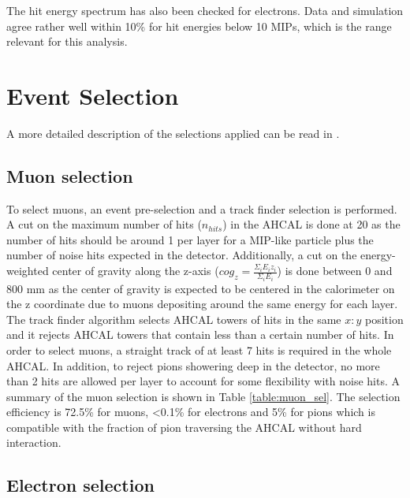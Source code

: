 \documentclass{JINST}
\begin{document}
The hit energy spectrum has also been checked for electrons. Data and simulation agree rather well within 10\% for hit energies below 10 MIPs, which is the range relevant for this analysis.

\section{Event Selection}

A more detailed description of the selections applied can be read in \cite{Brianne:2018rur}.

\subsection{Muon selection}

To select muons, an event pre-selection and a track finder \cite{Hartbrich:2016bbz} selection is performed. A cut on the maximum number of hits ($n_{hits}$) in the AHCAL is done at 20 as the number of hits should be around 1 per layer for a MIP-like particle plus the number of noise hits expected in the detector. Additionally, a cut on the energy-weighted center of gravity along the z-axis ($cog_{z} = \frac{\Sigma_{i} E_{i}z_{i}}{\Sigma_{i} E_{i}}$) is done between 0 and 800 mm as the center of gravity is expected to be centered in the calorimeter on the z coordinate due to muons depositing around the same energy for each layer. The track finder algorithm selects AHCAL towers of hits in the same $x:y$ position and it rejects AHCAL towers that contain less than a certain number of hits. In order to select muons, a straight track of at least 7 hits is required in the whole AHCAL. In addition, to reject pions showering deep in the detector, no more than 2 hits are allowed per layer to account for some flexibility with noise hits. A summary of the muon selection is shown in Table \ref{table:muon_sel}. The selection efficiency is 72.5\% for muons, <0.1\% for electrons and 5\% for pions which is compatible with the fraction of pion traversing the AHCAL without hard interaction.

\subsection{Electron selection}
\end{document}
